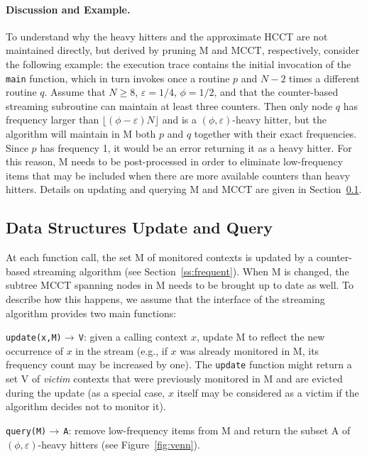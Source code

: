 \documentclass{sigplanconf}
\begin{document}
\paragraph{Discussion and Example.} To understand why the heavy hitters and the approximate HCCT are not maintained directly, but derived by pruning M and MCCT, respectively, consider the following example: the execution trace contains the initial invocation of the {\tt main} function, which in turn invokes once a routine $p$ and $N-2$ times a different routine $q$. Assume that $N\ge 8$, $\varepsilon=1/4$, $\phi=1/2$, and that the counter-based streaming subroutine can maintain at least three counters. Then only node $q$ has frequency larger than $\lfloor(\phi-\varepsilon)N\rfloor$ and is a $(\phi,\varepsilon)$-heavy hitter, but the algorithm will maintain in M both $p$ and $q$ together with their exact frequencies. Since $p$ has frequency 1, it would be an error returning it as a heavy hitter. For this reason, M needs to be post-processed in order to eliminate low-frequency items that may be included when there are more available counters than heavy hitters. Details on updating and querying M and MCCT are given in Section~\ref{ss:update}.


\subsection{Data Structures Update and Query}
\label{ss:update}

At each function call, the set M of monitored contexts is updated by a counter-based streaming algorithm (see Section~\ref{ss:frequent}). When M is changed, the subtree MCCT spanning nodes in M needs to be brought up to date as well. To describe how this happens, we assume that the interface of the streaming algorithm provides two main functions:

\begin{description}

 \item {\tt update(x,M)}$\rightarrow\,${\tt V}: given a calling context $x$, update M to reflect the new occurrence of $x$ in the stream (e.g., if $x$ was already monitored in M, its frequency count may be increased by one). The {\tt update} function might return a set V of {\em victim} contexts that were previously monitored in M and are evicted during the update (as a special case, $x$ itself may be considered as a victim if the algorithm decides not to monitor it).

\item {\tt query(M)}$\rightarrow\,${\tt A}: remove low-frequency items from M and return the subset A of $(\phi,\varepsilon)$-heavy hitters (see Figure~\ref{fig:venn}).
\end{description}
\end{document}
